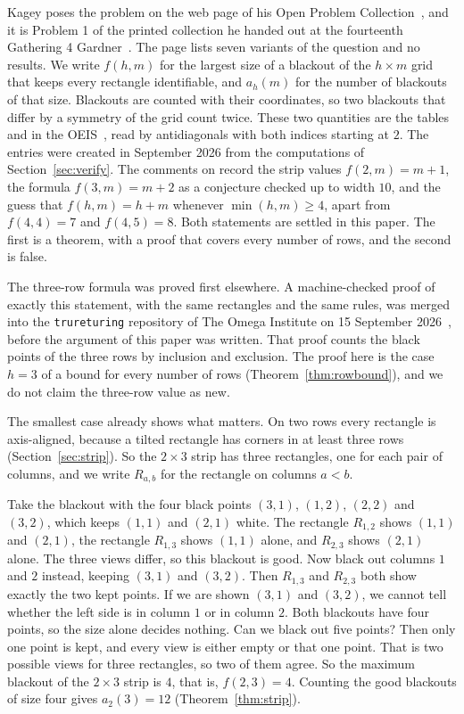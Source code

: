 Kagey poses the problem on the web page of his Open Problem
Collection~\cite{kagey001}, and it is Problem 1 of the printed collection he handed
out at the fourteenth Gathering 4 Gardner~\cite{kageyG4G14}. The page lists seven
variants of the question and no results. We write $f(h,m)$ for the largest size of a
blackout of the $h\times m$ grid that keeps every rectangle identifiable, and $a_h(m)$
for the number of blackouts of that size. Blackouts are counted with their
coordinates, so two blackouts that differ by a symmetry of the grid count twice. These
two quantities are the tables  and  in the
OEIS~\cite{oeis}, read by antidiagonals with both indices starting at $2$. The entries
were created in September 2026 from the computations of Section~\ref{sec:verify}. The
comments on  record the strip values $f(2,m)=m+1$, the formula
$f(3,m)=m+2$ as a conjecture checked up to width $10$, and the guess that
$f(h,m)=h+m$ whenever $\min(h,m)\ge4$, apart from $f(4,4)=7$ and $f(4,5)=8$. Both
statements are settled in this paper. The first is a theorem, with a proof that
covers every number of rows, and the second is false.

The three-row formula was proved first elsewhere. A machine-checked proof of exactly
this statement, with the same rectangles and the same rules, was merged into the
\texttt{trureturing} repository of The Omega Institute on 15 September
2026~\cite{trureturing2026}, before the argument of this paper was written. That
proof counts the black points of the three rows by inclusion and exclusion. The proof
here is the case $h=3$ of a bound for every number of rows
(Theorem~\ref{thm:rowbound}), and we do not claim the three-row value as new.

The smallest case already shows what matters. On two rows every rectangle is
axis-aligned, because a tilted rectangle has corners in at least three rows
(Section~\ref{sec:strip}). So the $2\times3$ strip has three rectangles, one for each
pair of columns, and we write $R_{a,b}$ for the rectangle on columns $a<b$.

\begin{example}\label{ex:strip23}
Take the blackout with the four black points $(3,1)$, $(1,2)$, $(2,2)$ and $(3,2)$,
which keeps $(1,1)$ and $(2,1)$ white. The rectangle $R_{1,2}$ shows $(1,1)$ and
$(2,1)$, the rectangle $R_{1,3}$ shows $(1,1)$ alone, and $R_{2,3}$ shows $(2,1)$
alone. The three views differ, so this blackout is good. Now black out columns $1$ and
$2$ instead, keeping $(3,1)$ and $(3,2)$. Then $R_{1,3}$ and $R_{2,3}$ both show
exactly the two kept points. If we are shown $(3,1)$ and $(3,2)$, we cannot tell
whether the left side is in column $1$ or in column $2$. Both blackouts have four
points, so the size alone decides nothing. Can we black out five points? Then only
one point is kept, and every view is either empty or that one point. That is two
possible views for three rectangles, so two of them agree. So the maximum blackout of
the $2\times3$ strip is $4$, that is, $f(2,3)=4$. Counting the good blackouts of
size four gives $a_2(3)=12$ (Theorem~\ref{thm:strip}).
\end{example}

